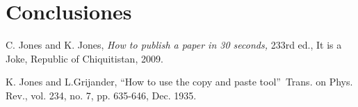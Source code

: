 \documentclass[10pt,conference,a4paper]{IEEEtran}
\begin{document}
\section{Conclusiones}


\begin{thebibliography}{9}                                                                                                %
    C. Jones and K. Jones, \emph{How to publish a paper in 30
seconds,} 233rd ed., It is a Joke, Republic of Chiquitistan, 2009.

    K. Jones and L.Grijander, \textquotedblleft How to use
the copy and paste tool\textquotedblright\ Trans. on Phys. Rev., vol. 234, no.
7, pp. 635-646, Dec. 1935.
\end{thebibliography}
\end{document}
